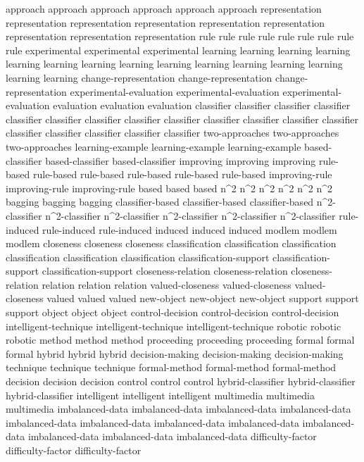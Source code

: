 approach	approach	approach	approach	approach	approach	
representation	representation	representation	representation	representation	representation	representation	representation	representation	
rule	rule	rule	rule	rule	rule	rule	rule	rule	
experimental	experimental	experimental	
learning	learning	learning	learning	learning	learning	learning	learning	learning	learning	learning	learning	learning	learning	learning	
change-representation	change-representation	change-representation	
experimental-evaluation	experimental-evaluation	experimental-evaluation	
evaluation	evaluation	evaluation	
classifier	classifier	classifier	classifier	classifier	classifier	classifier	classifier	classifier	classifier	classifier	classifier	classifier	classifier	classifier	classifier	classifier	classifier	
two-approaches	two-approaches	two-approaches	
learning-example	learning-example	learning-example	
based-classifier	based-classifier	based-classifier	
improving	improving	improving	
rule-based	rule-based	rule-based	rule-based	rule-based	rule-based	
improving-rule	improving-rule	improving-rule	
based	based	based	
n^2	n^2	n^2	n^2	n^2	n^2	
bagging	bagging	bagging	
classifier-based	classifier-based	classifier-based	
n^2-classifier	n^2-classifier	n^2-classifier	n^2-classifier	n^2-classifier	n^2-classifier	
rule-induced	rule-induced	rule-induced	
induced	induced	induced	
modlem	modlem	modlem	
closeness	closeness	closeness	
classification	classification	classification	classification	classification	classification	
classification-support	classification-support	classification-support	
closeness-relation	closeness-relation	closeness-relation	
relation	relation	relation	
valued-closeness	valued-closeness	valued-closeness	
valued	valued	valued	
new-object	new-object	new-object	
support	support	support	
object	object	object	
control-decision	control-decision	control-decision	
intelligent-technique	intelligent-technique	intelligent-technique	
robotic	robotic	robotic	
method	method	method	
proceeding	proceeding	proceeding	
formal	formal	formal	
hybrid	hybrid	hybrid	
decision-making	decision-making	decision-making	
technique	technique	technique	
formal-method	formal-method	formal-method	
decision	decision	decision	
control	control	control	
hybrid-classifier	hybrid-classifier	hybrid-classifier	
intelligent	intelligent	intelligent	
multimedia	multimedia	multimedia	
imbalanced-data	imbalanced-data	imbalanced-data	imbalanced-data	imbalanced-data	imbalanced-data	imbalanced-data	imbalanced-data	imbalanced-data	imbalanced-data	imbalanced-data	imbalanced-data	
difficulty-factor	difficulty-factor	difficulty-factor	
